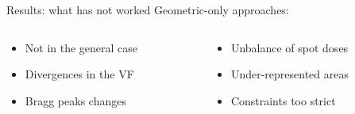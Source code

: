 \begin{frame}[c]{Results: what has not worked}
	Geometric-only approaches:
	\begin{columns}[c]
		\begin{column}{0.55\textwidth}
			\begin{itemize}
				\item Not in the general case
				\item Divergences in the VF
				\item Bragg peaks changes
			\end{itemize}
		\end{column}
		\begin{column}{0.45\textwidth}
			\begin{itemize}
				\item Unbalance of spot doses
				\item Under-represented areas
				\item Constraints too strict
			\end{itemize}
		\end{column}
	\end{columns}
    \begin{figure}
    \end{figure}
\end{frame}


